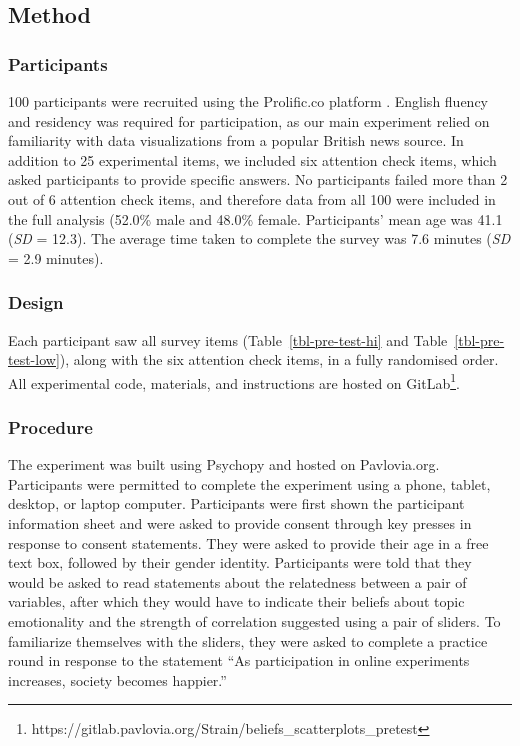 \documentclass[manuscript,screen,review]{acmart}
\begin{document}
\subsection{Method}\label{sec-method-pre}

\subsubsection{Participants}\label{sec-participants-pre}

100 participants were recruited using the Prolific.co platform
\citep{prolific}. English fluency and residency was required for
participation, as our main experiment relied on familiarity with data
visualizations from a popular British news source. In addition to 25
experimental items, we included six attention check items, which asked
participants to provide specific answers. No participants failed more
than 2 out of 6 attention check items, and therefore data from all 100
were included in the full analysis (52.0\% male and 48.0\% female.
Participants' mean age was 41.1 (\emph{SD} = 12.3). The average time
taken to complete the survey was 7.6 minutes (\emph{SD} = 2.9 minutes).

\subsubsection{Design}\label{sec-design-pre}

Each participant saw all survey items (Table~\ref{tbl-pre-test-hi} and
Table~\ref{tbl-pre-test-low}), along with the six attention check items,
in a fully randomised order. All experimental code, materials, and
instructions are hosted on GitLab\footnote{https://gitlab.pavlovia.org/Strain/beliefs\_scatterplots\_pretest}.

\subsubsection{Procedure}\label{sec-procedure-pre}

The experiment was built using Psychopy \citep{pierce_2019} and hosted
on Pavlovia.org. Participants were permitted to complete the experiment
using a phone, tablet, desktop, or laptop computer. Participants were
first shown the participant information sheet and were asked to provide
consent through key presses in response to consent statements. They were
asked to provide their age in a free text box, followed by their gender
identity. Participants were told that they would be asked to read
statements about the relatedness between a pair of variables, after
which they would have to indicate their beliefs about topic emotionality
and the strength of correlation suggested using a pair of sliders. To
familiarize themselves with the sliders, they were asked to complete a
practice round in response to the statement ``As participation in online
experiments increases, society becomes happier.''
\end{document}

